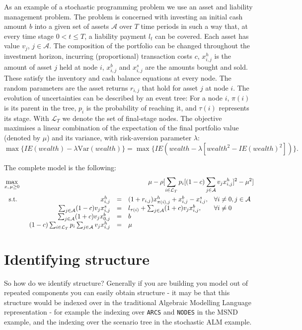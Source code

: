 \documentclass[10pt,a4paper]{book}
\newcommand{\E}{\mbox{$I\!\!E$}}
\newcommand{\Var}{\mathrm{Var}}
\begin{document}
As an example of a stochastic programming problem we use an asset and
liability management problem.
The problem is concerned with investing an initial cash amount $b$ into
a given set of assets $\mathcal{A}$ over $T$ time periods in such a way
that, at every time stage $0 < t \le T$, a liability payment $l_t$ 
can be covered.
Each asset has value $v_j$, $j\in\mathcal{A}$.
The composition of the portfolio can be changed throughout the investment
horizon, incurring (proportional) transaction costs $c$,
$x_{i,j}^h$ is the amount of asset $j$ held at node $i$,
$x_{i,j}^b$ and $x_{i,j}^s$ are the amounts bought and sold.
These satisfy the inventory and cash balance equations at every node.
The random parameters are the asset returns $r_{i,j}$ that hold
for asset $j$ at node $i$.
The evolution of uncertainties can be described by an event tree:
For a node $i$, $\pi(i)$ is its parent in the tree,
$p_i$ is the probability of reaching it, 
and $\tau(i)$ represents its stage.
With $\mathcal{L}_T$ we denote the set of final-stage nodes.
%
The objective maximises a linear combination of the expectation of the final
portfolio value (denoted by $\mu$) and its variance, with risk-aversion
parameter $\lambda$:
\[
 \max \{\E(wealth) - \lambda\Var(wealth)\} = 
 \max \{\E\left(wealth - \lambda \left[wealth^2 - \E(wealth)^2\right]\right)\}.
\]


The complete model is the following:
\begin{eqnarray}
\max_{x,\,\mu\ge 0}&& \mu - \rho[\sum_{i\in\mathcal{L}_T}
p_i [(1-c)\sum_{j\in\mathcal{A}} v_j x_{i,j}^h]^2 - \mu^2]\notag\\
\text{~s.t.~}&&
\begin{array}[t]{rcll}
x_{i,j}^h &=& (1+r_{i,j})x_{\pi(i),j}^h +  x_{i,j}^b - x_{i,j}^s,&\forall i\ne 0, j\in\mathcal{A}\\
\sum_{j\in\mathcal{A}} (1-c) v_j x_{i,j}^s &=& l_{\tau(i)} + \sum_{j\in\mathcal{A}} (1+c) v_j x_{i,j}^b, &\forall i\ne 0\\ 
\sum_{j\in\mathcal{A}} (1+c) v_j x_{0,j}^b &=& b\\
 (1-c) \sum_{i\in \mathcal{L}_T} p_i\sum_{j\in\mathcal{A}} v_j x_{i,j}^h &=& \mu
\end{array}
\label{alm}
\end{eqnarray}

\section{Identifying structure}

So how do we identify structure? Generally if you are building you model out
of repeated components you can easily obtain structure - it may be that this
structure would be indexed over in the traditional Algebraic Modelling Language
representation - for example the indexing over {\tt ARCS} and {\tt NODES} in
the MSND example, and the indexing over the scenario tree in the stochastic
ALM example.
\end{document}
